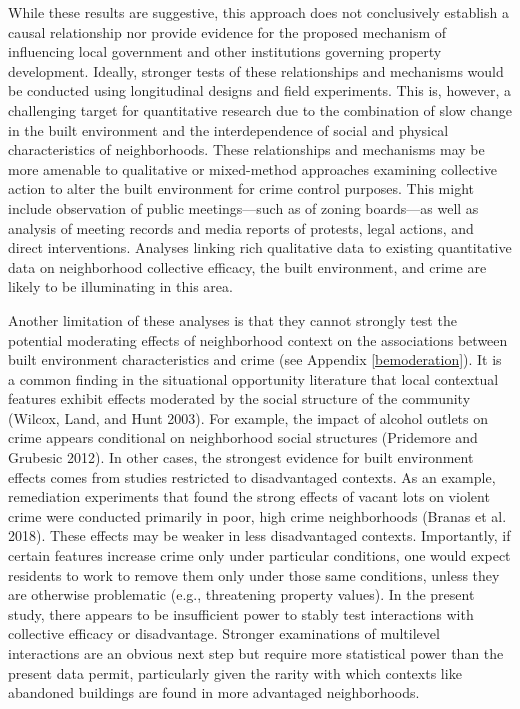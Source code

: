 \documentclass [11pt, proquest] {uwthesis}[2015/03/03]
\begin{document}
While these results are suggestive, this approach does not conclusively establish a causal relationship nor provide evidence for the proposed mechanism of influencing local government and other institutions governing property development. Ideally, stronger tests of these relationships and mechanisms would be conducted using longitudinal designs and field experiments. This is, however, a challenging target for quantitative research due to the combination of slow change in the built environment and the interdependence of social and physical characteristics of neighborhoods. These relationships and mechanisms may be more amenable to qualitative or mixed-method approaches examining collective action to alter the built environment for crime control purposes. This might include observation of public meetings---such as of zoning boards---as well as analysis of meeting records and media reports of protests, legal actions, and direct interventions. Analyses linking rich qualitative data to existing quantitative data on neighborhood collective efficacy, the built environment, and crime are likely to be illuminating in this area.

Another limitation of these analyses is that they cannot strongly test the potential moderating effects of neighborhood context on the associations between built environment characteristics and crime (see Appendix \ref{bemoderation}). It is a common finding in the situational opportunity literature that local contextual features exhibit effects moderated by the social structure of the community (Wilcox, Land, and Hunt 2003). For example, the impact of alcohol outlets on crime appears conditional on neighborhood social structures (Pridemore and Grubesic 2012). In other cases, the strongest evidence for built environment effects comes from studies restricted to disadvantaged contexts. As an example, remediation experiments that found the strong effects of vacant lots on violent crime were conducted primarily in poor, high crime neighborhoods (Branas et al. 2018). These effects may be weaker in less disadvantaged contexts. Importantly, if certain features increase crime only under particular conditions, one would expect residents to work to remove them only under those same conditions, unless they are otherwise problematic (e.g., threatening property values). In the present study, there appears to be insufficient power to stably test interactions with collective efficacy or disadvantage. Stronger examinations of multilevel interactions are an obvious next step but require more statistical power than the present data permit, particularly given the rarity with which contexts like abandoned buildings are found in more advantaged neighborhoods.
\end{document}
